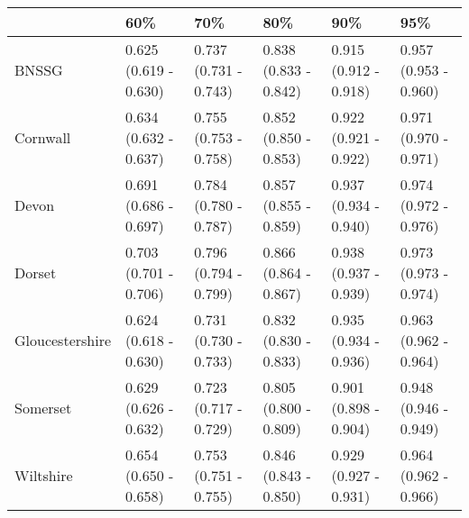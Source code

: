 \begin{tabular}{llllll}
\toprule
{} &                    60\% &                    70\% &                    80\% &                    90\% &                    95\% \\
\midrule
BNSSG           &  0.625 (0.619 - 0.630) &  0.737 (0.731 - 0.743) &  0.838 (0.833 - 0.842) &  0.915 (0.912 - 0.918) &  0.957 (0.953 - 0.960) \\
Cornwall        &  0.634 (0.632 - 0.637) &  0.755 (0.753 - 0.758) &  0.852 (0.850 - 0.853) &  0.922 (0.921 - 0.922) &  0.971 (0.970 - 0.971) \\
Devon           &  0.691 (0.686 - 0.697) &  0.784 (0.780 - 0.787) &  0.857 (0.855 - 0.859) &  0.937 (0.934 - 0.940) &  0.974 (0.972 - 0.976) \\
Dorset          &  0.703 (0.701 - 0.706) &  0.796 (0.794 - 0.799) &  0.866 (0.864 - 0.867) &  0.938 (0.937 - 0.939) &  0.973 (0.973 - 0.974) \\
Gloucestershire &  0.624 (0.618 - 0.630) &  0.731 (0.730 - 0.733) &  0.832 (0.830 - 0.833) &  0.935 (0.934 - 0.936) &  0.963 (0.962 - 0.964) \\
Somerset        &  0.629 (0.626 - 0.632) &  0.723 (0.717 - 0.729) &  0.805 (0.800 - 0.809) &  0.901 (0.898 - 0.904) &  0.948 (0.946 - 0.949) \\
Wiltshire       &  0.654 (0.650 - 0.658) &  0.753 (0.751 - 0.755) &  0.846 (0.843 - 0.850) &  0.929 (0.927 - 0.931) &  0.964 (0.962 - 0.966) \\
\bottomrule
\end{tabular}

